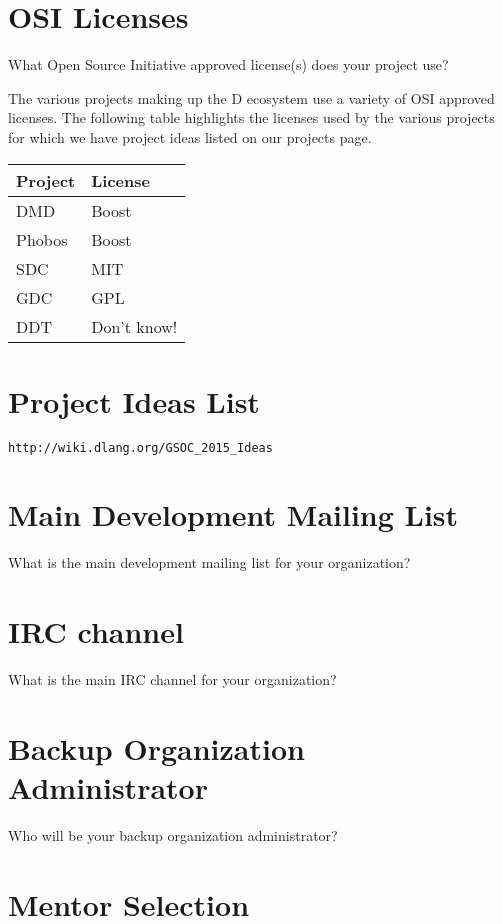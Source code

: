 \documentclass[a4paper,12pt]{article}
\begin{document}
\section{OSI Licenses}

What Open Source Initiative approved license(s) does your project use?

The various projects making up the D ecosystem use a variety of OSI approved
licenses.  The following table highlights the licenses used by the various projects
for which we have project ideas listed on our projects page.

\begin{center}
   \begin{tabular}{ | l | l | }
     \hline
     \textbf{Project} & \textbf{License} \\ \hline
     DMD & Boost \\
     Phobos & Boost \\
     SDC & MIT \\
     GDC & GPL \\
     DDT & Don't know!  \\ \hline
   \end{tabular}
\end{center}


\section{Project Ideas List}

\texttt{http://wiki.dlang.org/GSOC\_2015\_Ideas}

\section{Main Development Mailing List}
What is the main development mailing list for your organization?

\section{IRC channel}
What is the main IRC channel for your organization?

\section{Backup Organization Administrator}
Who will be your backup organization administrator?

\section{Mentor Selection}
\end{document}
